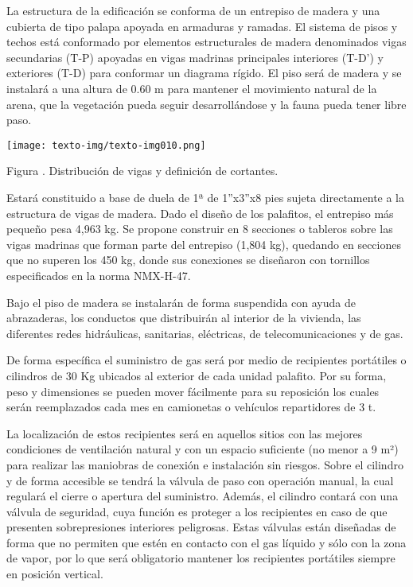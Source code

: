 \documentclass{article}
\newcounter{Figura}
\renewcommand\theFigura{\arabic{Figura}}
\begin{document}
\bigskip

La estructura de la edificación se conforma de un entrepiso de madera y una cubierta de tipo palapa apoyada en armaduras y ramadas. El sistema de pisos y techos está conformado por elementos estructurales de madera denominados vigas secundarias (T-P) apoyadas en vigas madrinas principales interiores (T-D’) y exteriores (T-D) para conformar un diagrama rígido. El piso será de madera y se instalará a una altura de 0.60 m para mantener el movimiento natural de la arena, que la vegetación pueda seguir desarrollándose y la fauna pueda tener libre paso. 


\bigskip

 \texttt{[image: texto-img/texto-img010.png]} 

Figura \stepcounter{Figura}{\theFigura}. Distribución de vigas y definición de cortantes.


\bigskip


\bigskip

Estará constituido a base de duela de 1ª de 1”x3”x8 pies sujeta directamente a la estructura de vigas de madera. Dado el diseño de los palafitos, el entrepiso más pequeño pesa 4,963 kg. Se propone construir en 8 secciones o tableros sobre las vigas madrinas que forman parte del entrepiso (1,804 kg), quedando en secciones que no superen los 450 kg, donde sus conexiones se diseñaron con tornillos especificados en la norma NMX-H-47.


\bigskip

Bajo el piso de madera se instalarán de forma suspendida con ayuda de abrazaderas, los conductos que distribuirán al interior de la vivienda, las diferentes redes hidráulicas, sanitarias, eléctricas, de telecomunicaciones y de gas. 


\bigskip

De forma específica el suministro de gas será por medio de recipientes portátiles o cilindros de 30 Kg ubicados al exterior de cada unidad palafito. Por su forma, peso y dimensiones se pueden mover fácilmente para su reposición los cuales serán reemplazados cada mes en camionetas o vehículos repartidores de 3 t.


\bigskip

La localización de estos recipientes será en aquellos sitios con las mejores condiciones de ventilación natural y con un espacio suficiente (no menor a 9 m²) para realizar las maniobras de conexión e instalación sin riesgos. Sobre el cilindro y de forma accesible se tendrá la válvula de paso con operación manual, la cual regulará el cierre o apertura del suministro. Además, el cilindro contará con una válvula de seguridad, cuya función es proteger a los recipientes en caso de que presenten sobrepresiones interiores peligrosas. Estas válvulas están diseñadas de forma que no permiten que estén en contacto con el gas líquido y sólo con la zona de vapor, por lo que será obligatorio mantener los recipientes portátiles siempre en posición vertical.
\end{document}
